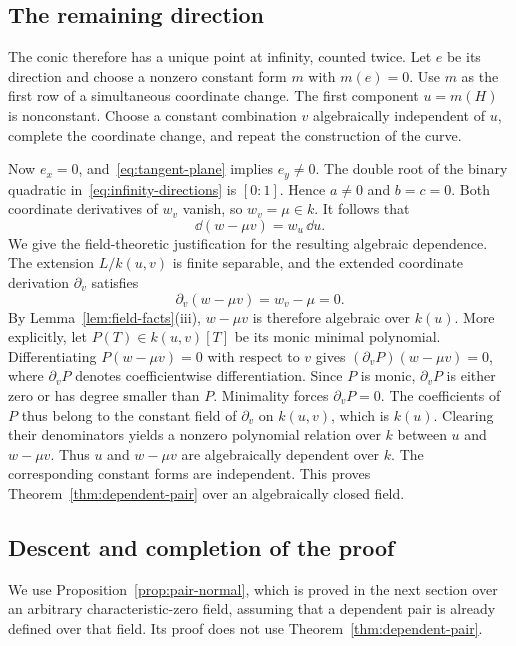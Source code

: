 \subsection{The remaining direction}
The conic therefore has a unique point at infinity, counted twice. Let $e$ be its direction and choose a nonzero constant form $m$ with $m(e)=0$. Use $m$ as the first row of a simultaneous coordinate change. The first component $u=m(H)$ is nonconstant. Choose a constant combination $v$ algebraically independent of $u$, complete the coordinate change, and repeat the construction of the curve.

Now $e_x=0$, and~\eqref{eq:tangent-plane} implies $e_y\neq0$. The double root of the binary quadratic in~\eqref{eq:infinity-directions} is $[0:1]$. Hence $a\neq0$ and $b=c=0$. Both coordinate derivatives of $w_v$ vanish, so $w_v=\mu\in k$. It follows that
\[
 \dd(w-\mu v)=w_u\,\dd u.
\]
We give the field-theoretic justification for the resulting algebraic dependence. The extension $L/k(u,v)$ is finite separable, and the extended coordinate derivation $\partial_v$ satisfies
\[
 \partial_v(w-\mu v)=w_v-\mu=0.
\]
By Lemma~\ref{lem:field-facts}(iii), $w-\mu v$ is therefore algebraic over $k(u)$. More explicitly, let $P(T)\in k(u,v)[T]$ be its monic minimal polynomial. Differentiating $P(w-\mu v)=0$ with respect to $v$ gives $(\partial_vP)(w-\mu v)=0$, where $\partial_vP$ denotes coefficientwise differentiation. Since $P$ is monic, $\partial_vP$ is either zero or has degree smaller than $P$. Minimality forces $\partial_vP=0$. The coefficients of $P$ thus belong to the constant field of $\partial_v$ on $k(u,v)$, which is $k(u)$. Clearing their denominators yields a nonzero polynomial relation over $k$ between $u$ and $w-\mu v$. Thus $u$ and $w-\mu v$ are algebraically dependent over $k$. The corresponding constant forms are independent. This proves Theorem~\ref{thm:dependent-pair} over an algebraically closed field.

\subsection{Descent and completion of the proof}
We use Proposition~\ref{prop:pair-normal}, which is proved in the next section over an arbitrary characteristic-zero field, assuming that a dependent pair is already defined over that field. Its proof does not use Theorem~\ref{thm:dependent-pair}.

